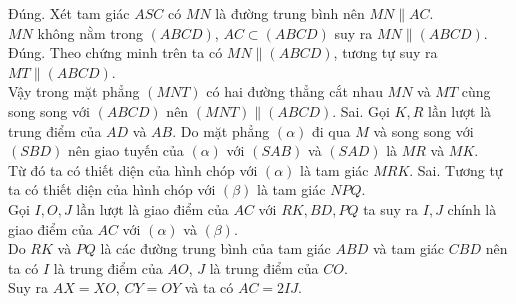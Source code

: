 \begin{ex}
{\begin{itemchoice}
		\itemch Đúng. Xét tam giác $ASC$ có $MN$ là đường trung bình nên $MN\parallel AC$.\\ $MN$ không nằm trong $(ABCD)$, $AC\subset (ABCD)$ suy ra $MN\parallel (ABCD)$.
		\itemch Đúng. Theo chứng minh trên ta có $MN\parallel (ABCD)$, tương tự suy ra $MT \parallel (ABCD)$.\\	
		Vậy trong mặt phẳng $(MNT)$ có hai đường thẳng cắt nhau $MN$ và $MT$ cùng song song với $(ABCD)$ nên $(MNT)\parallel (ABCD)$.
		\itemch Sai. Gọi $K, R$ lần lượt là trung điểm của $AD$ và $AB$. Do mặt phẳng $(\alpha)$ đi qua $M$ và song song với $(SBD)$ nên giao tuyến của $(\alpha)$ với $(SAB)$ và $(SAD)$ là $MR$ và $MK$.\\	
		Từ đó ta có thiết diện của hình chóp với $(\alpha)$ là tam giác $MRK$.
		\itemch Sai. Tương tự ta có thiết diện của hình chóp với $(\beta)$ là tam giác $NPQ$.\\
		Gọi $I, O, J$ lần lượt là giao điểm của $AC$ với $RK, BD, PQ$ ta suy ra $I, J$ chính là giao điểm của $AC$ với $(\alpha)$ và $(\beta)$.\\	
		Do $RK$ và $PQ$ là các đường trung bình của tam giác $ABD$ và tam giác $CBD$ nên ta có $I$ là trung điểm của $AO$, $J$ là trung điểm của $CO$.\\
		Suy ra $AX=XO$, $CY=OY$ và ta có $AC=2IJ$.
	\end{itemchoice}
}
\end{ex}

